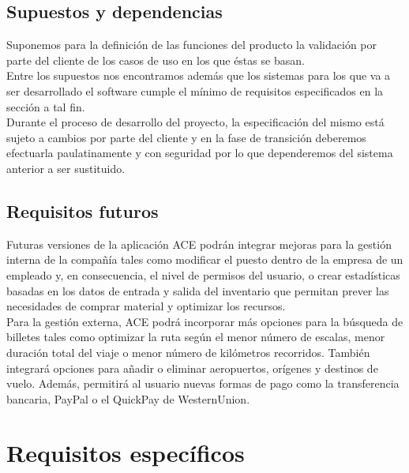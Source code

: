 \documentclass[11pt, a4paper, twoside, titlepage]{article}
\begin{document}
		\subsection{Supuestos y dependencias} %
			
			Suponemos para la definición de las funciones del producto la validación por parte del cliente de los casos de uso en los que éstas se basan.\\
			Entre los supuestos nos encontramos además que los sistemas para los que va a ser desarrollado el software cumple el mínimo de requisitos especificados en la sección a tal fin.\\

			Durante el proceso de desarrollo del proyecto, la especificación del mismo está sujeto a cambios por parte del cliente y en la fase de transición deberemos efectuarla paulatinamente y con seguridad por lo que dependeremos del sistema anterior a ser sustituido.
			
		\subsection{Requisitos futuros}
			Futuras versiones de la aplicación ACE podrán integrar mejoras para la gestión interna de la compañía tales como modificar el puesto dentro de la empresa de un empleado y, en consecuencia, el nivel de permisos del usuario, o crear estadísticas basadas en los datos de entrada y salida del inventario que permitan prever las necesidades de comprar material y optimizar los recursos. \\
		
			Para la gestión externa, ACE podrá incorporar más opciones para la búsqueda de billetes tales como optimizar la ruta según el menor número de escalas, menor duración total del viaje o menor número de kilómetros recorridos. También integrará opciones para añadir o eliminar aeropuertos, orígenes y destinos de vuelo. Además, permitirá al usuario nuevas formas de pago como la transferencia bancaria, \gls{PayPal} o el \gls{QuickPay} de \gls{WesternUnion}.

	\section{Requisitos específicos}
\end{document}
